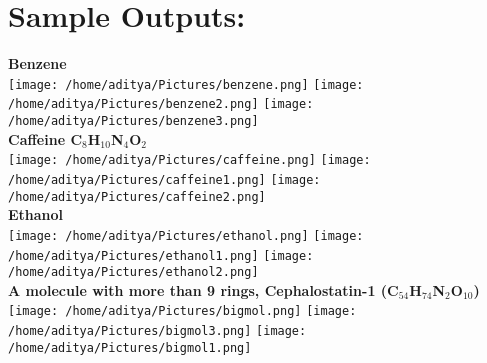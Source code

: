\documentclass{report}
\begin{document}
\section*{Sample Outputs:}
\textbf{Benzene}\\
\texttt{[image: /home/aditya/Pictures/benzene.png]}
\texttt{[image: /home/aditya/Pictures/benzene2.png]}
\texttt{[image: /home/aditya/Pictures/benzene3.png]}\\
\textbf{Caffeine C$_8$H$_10$N$_4$O$_2$}\\
\texttt{[image: /home/aditya/Pictures/caffeine.png]}
\texttt{[image: /home/aditya/Pictures/caffeine1.png]}
\texttt{[image: /home/aditya/Pictures/caffeine2.png]}\\
\textbf{Ethanol}\\
\texttt{[image: /home/aditya/Pictures/ethanol.png]}
\texttt{[image: /home/aditya/Pictures/ethanol1.png]}
\texttt{[image: /home/aditya/Pictures/ethanol2.png]}\\
\textbf{A molecule with more than 9 rings, Cephalostatin-1 (C$_54$H$_74$N$_2$O$_10$)}\\
\texttt{[image: /home/aditya/Pictures/bigmol.png]}
\texttt{[image: /home/aditya/Pictures/bigmol3.png]}
\texttt{[image: /home/aditya/Pictures/bigmol1.png]}\\
\\
\end{document}

